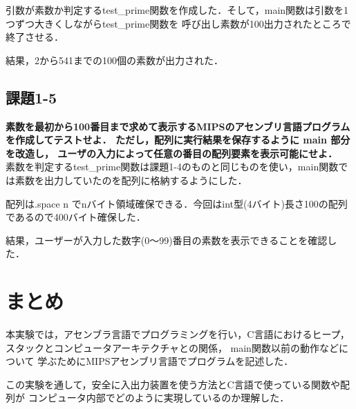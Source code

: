 \documentclass[11pt]{jarticle}
\begin{document}
引数が素数か判定するtest\_prime関数を作成した．そして，main関数は引数を1つずつ大きくしながらtest\_prime関数を
呼び出し素数が100出力されたところで終了させる．

結果，2から541までの100個の素数が出力された．

\subsection{課題1-5}

\textbf{素数を最初から100番目まで求めて表示するMIPSのアセンブリ言語プログラムを作成してテストせよ． ただし，配列に実行結果を保存するように main 部分を改造し， ユーザの入力によって任意の番目の配列要素を表示可能にせよ．}\\

素数を判定するtest\_prime関数は課題1-4のものと同じものを使い，main関数では素数を出力していたのを配列に格納するようにした．

配列は.space n でnバイト領域確保できる．今回はint型(4バイト)長さ100の配列であるので400バイト確保した．

結果，ユーザーが入力した数字(0～99)番目の素数を表示できることを確認した．

\section{まとめ}
本実験では，アセンブラ言語でプログラミングを行い，C言語におけるヒープ，
スタックとコンピュータアーキテクチャとの関係， main関数以前の動作などについて
学ぶためにMIPSアセンブリ言語でプログラムを記述した．

この実験を通して，安全に入出力装置を使う方法とC言語で使っている関数や配列が
コンピュータ内部でどのように実現しているのか理解した．
\end{document}
